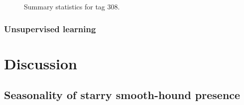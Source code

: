 \documentclass[
  authoryear,
  review,
  3p]{elsarticle}
\begin{document}
\begin{figure}
\begin{minipage}[t]{0.40\linewidth}
{{}

}

\end{minipage}%
\newline
\begin{minipage}[t]{\linewidth}

{\centering 


}

\end{minipage}%

\caption{\label{fig-dstsummary308}Summary statistics for tag 308.}

\end{figure}

\hypertarget{unsupervised-learning}{%
\subsubsection{Unsupervised learning}\label{unsupervised-learning}}

\hypertarget{discussion}{%
\section{Discussion}\label{discussion}}

\hypertarget{seasonality-of-starry-smooth-hound-presence}{%
\subsection{Seasonality of starry smooth-hound
presence}\label{seasonality-of-starry-smooth-hound-presence}}
\end{document}
